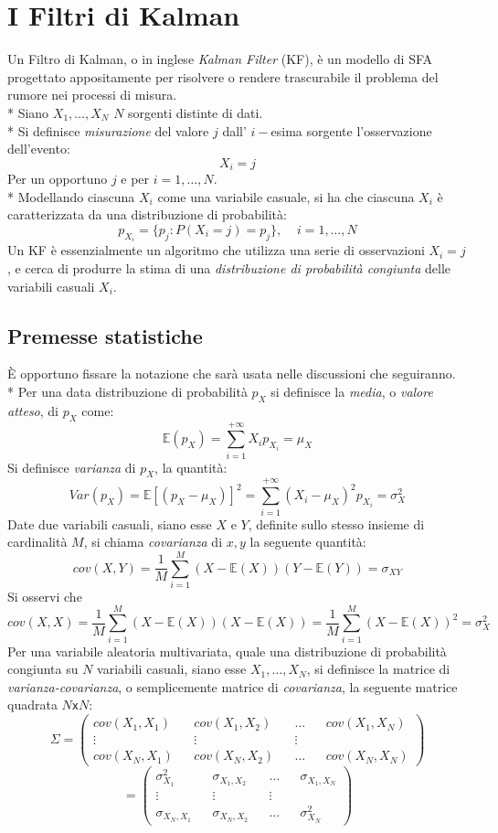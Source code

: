 \section{I Filtri di Kalman}
Un Filtro di Kalman, o in inglese \emph{Kalman Filter} (KF), \`e un modello di SFA progettato appositamente per risolvere o rendere trascurabile il problema del rumore nei processi di misura.\\*
Siano $X_1,\dots,X_N$ $N$ sorgenti distinte di dati.\\*
Si definisce \emph{misurazione} del valore $j$ dall' $i-$esima sorgente l'osservazione dell'evento:
$$
X_i = j
$$
Per un opportuno $j$ e per $i = 1,\dots,N$.\\*
Modellando ciascuna $X_i$ come una variabile casuale, si ha che ciascuna $X_i$ \`e caratterizzata da una distribuzione di probabilit\`a:
$$
p_{X_i} = \{p_j:P(X_i = j) = p_j\},\;\;\;\;i = 1,\dots,N
$$
Un KF \`e essenzialmente un algoritmo che utilizza una serie di osservazioni $X_i = j$, e cerca di produrre la stima di una \emph{distribuzione di probabilit\`a congiunta} delle variabili casuali $X_i$.
\subsection{Premesse statistiche}
\`E opportuno fissare la notazione che sar\`a usata nelle discussioni che seguiranno.\\*
Per una data distribuzione di probabilit\`a $p_X$ si definisce la \emph{media}, o \emph{valore atteso}, di $p_X$ come:
$$
\mathbb{E}(p_X) = \sum_{i=1}^{+\infty} X_i p_{X_i} = \mu_X
$$
Si definisce \emph{varianza} di $p_X$, la quantit\`a:
$$
Var(p_X) = \mathbb{E}[(p_X-\mu_X)]^2 = \sum_{i=1}^{+\infty} (X_i - \mu_X)^2p_{X_i} = \sigma^2_X
$$
Date due variabili casuali, siano esse $X$ e $Y$, definite sullo stesso insieme di cardinalit\`a $M$, si chiama \emph{covarianza} di $x,y$ la seguente quantit\`a:
$$
cov(X,Y) = \frac{1}{M}\sum_{i=1}^M (X-\mathbb{E}(X))(Y-\mathbb{E}(Y)) = \sigma_{XY}
$$
Si osservi che 
$$
cov(X,X) =  \frac{1}{M}\sum_{i=1}^M (X-\mathbb{E}(X))(X-\mathbb{E}(X)) =  \frac{1}{M}\sum_{i=1}^M (X-\mathbb{E}(X))^2 = \sigma^2_X
$$
Per una variabile aleatoria multivariata, quale una distribuzione di probabilit\`a congiunta su $N$ variabili casuali, siano esse $X_1,\dots,X_N$, si definisce la matrice di \emph{varianza-covarianza}, o semplicemente matrice di \emph{covarianza}, la seguente matrice quadrata $N$\texttt{x}$N$:
$$
\Sigma = \left(\begin{matrix}
cov(X_1,X_1) && cov(X_1,X_2) && \dots && cov(X_1,X_N) \\
\vdots && \vdots && \vdots \\
cov(X_N,X_1) && cov(X_N, X_2) && \dots && cov(X_N,X_N)
\end{matrix}\right) 
$$
$$
 = \left(\begin{matrix}
\sigma^2_{X_1} && \sigma_{X_1,X_2} && \dots && \sigma_{X_1,X_N} \\
\vdots && \vdots && \vdots \\
\sigma_{X_N,X_1} && \sigma_{X_N, X_2} && \dots && \sigma^2_{X_N}
\end{matrix}\right)
$$

